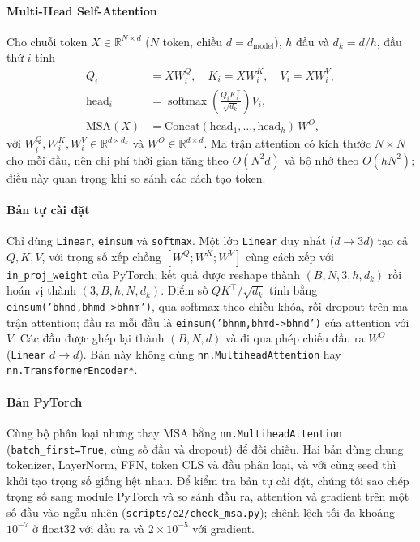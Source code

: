 \documentclass[a4paper,12pt]{article}
\DeclareMathOperator{\softmax}{softmax}
\begin{document}
\paragraph{Multi-Head Self-Attention}
Cho chuỗi token $X\in\mathbb{R}^{N\times d}$ ($N$ token, chiều $d=d_{\text{model}}$), $h$ đầu và $d_k=d/h$, đầu thứ $i$ tính
\begin{align}
    Q_i             & = XW_i^Q,\quad K_i = XW_i^K,\quad V_i = XW_i^V,                \\
    \mathrm{head}_i & = \softmax\!\left(\frac{Q_iK_i^{\top}}{\sqrt{d_k}}\right)V_i,  \\
    \mathrm{MSA}(X) & = \mathrm{Concat}(\mathrm{head}_1,\dots,\mathrm{head}_h)\,W^O,
\end{align}
với $W_i^Q,W_i^K,W_i^V\in\mathbb{R}^{d\times d_k}$ và $W^O\in\mathbb{R}^{d\times d}$. Ma trận attention có kích thước $N\times N$ cho mỗi đầu, nên chi phí thời gian tăng theo $O(N^2 d)$ và bộ nhớ theo $O(hN^2)$; điều này quan trọng khi so sánh các cách tạo token.

\paragraph{Bản tự cài đặt} Chỉ dùng \texttt{Linear}, \texttt{einsum} và \texttt{softmax}. Một lớp \texttt{Linear} duy nhất ($d\to3d$) tạo cả $Q,K,V$, với trọng số xếp chồng $[W^Q;W^K;W^V]$ cùng cách xếp với \texttt{in\_proj\_weight} của PyTorch; kết quả được reshape thành $(B,N,3,h,d_k)$ rồi hoán vị thành $(3,B,h,N,d_k)$. Điểm số $QK^\top/\sqrt{d_k}$ tính bằng \texttt{einsum('bhnd,\allowbreak bhmd-\allowbreak>\allowbreak bhnm')}, qua softmax theo chiều khóa, rồi dropout trên ma trận attention; đầu ra mỗi đầu là \texttt{einsum('bhnm,\allowbreak bhmd-\allowbreak>\allowbreak bhnd')} của attention với $V$. Các đầu được ghép lại thành $(B,N,d)$ và đi qua phép chiếu đầu ra $W^O$ (\texttt{Linear} $d\to d$). Bản này không dùng \texttt{nn.MultiheadAttention} hay \texttt{nn.TransformerEncoder*}.

\paragraph{Bản PyTorch} Cùng bộ phân loại nhưng thay MSA bằng \texttt{nn.MultiheadAttention} (\texttt{batch\_first=True}, cùng số đầu và dropout) để đối chiếu. Hai bản dùng chung tokenizer, LayerNorm, FFN, token CLS và đầu phân loại, và với cùng seed thì khởi tạo trọng số giống hệt nhau. Để kiểm tra bản tự cài đặt, chúng tôi sao chép trọng số sang module PyTorch và so sánh đầu ra, attention và gradient trên một số đầu vào ngẫu nhiên (\texttt{scripts/e2/check\_msa.py}); chênh lệch tối đa khoảng $10^{-7}$ ở float32 với đầu ra và $2\times10^{-5}$ với gradient.
\end{document}
